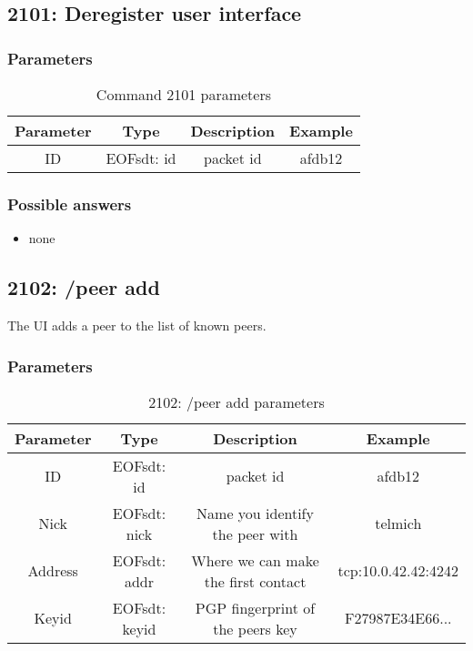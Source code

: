 \documentclass[12pt,a4paper]{book}
\begin{document}
\subsection{2101: Deregister user interface}

\subsubsection{Parameters}
\begin{longtable}{|c|c|c|c|}
\caption{Command 2101 parameters}\\
\hline
\textbf{Parameter} & \textbf{Type} & \textbf{Description} & \textbf{Example}\\
\hline
ID & EOFsdt: id & packet id & afdb12\\
\hline
\end{longtable}

\subsubsection{Possible answers}
\begin{itemize}
\item none
\end{itemize}
\subsection{2102: /peer add}
The UI adds a peer to the list of known peers.

\subsubsection{Parameters}
%
\begin{longtable}{|c|c|c|c|}
\caption{2102: /peer add parameters}\\
\hline
\textbf{Parameter} & \textbf{Type} & \textbf{Description} & \textbf{Example}\\
\hline
ID & EOFsdt: id & packet id & afdb12\\
\hline
Nick & EOFsdt: nick & Name you identify the peer with & telmich\\
\hline
Address & EOFsdt: addr & Where we can make the first contact & tcp:10.0.42.42:4242\\
\hline
Keyid & EOFsdt: keyid & PGP fingerprint of the peers key & F27987E34E66...\\
\hline
\end{longtable}
\end{document}

